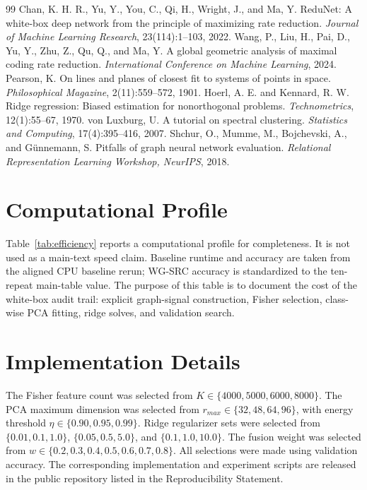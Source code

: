 \documentclass{article}
\newcommand{\SRC}{\textsc{WG-SRC}}
\begin{document}
\begin{thebibliography}{99}
 Chan, K. H. R., Yu, Y., You, C., Qi, H., Wright, J., and Ma, Y. ReduNet: A white-box deep network from the principle of maximizing rate reduction. \emph{Journal of Machine Learning Research}, 23(114):1--103, 2022.
 Wang, P., Liu, H., Pai, D., Yu, Y., Zhu, Z., Qu, Q., and Ma, Y. A global geometric analysis of maximal coding rate reduction. \emph{International Conference on Machine Learning}, 2024.
 Pearson, K. On lines and planes of closest fit to systems of points in space. \emph{Philosophical Magazine}, 2(11):559--572, 1901.
 Hoerl, A. E. and Kennard, R. W. Ridge regression: Biased estimation for nonorthogonal problems. \emph{Technometrics}, 12(1):55--67, 1970.
 von Luxburg, U. A tutorial on spectral clustering. \emph{Statistics and Computing}, 17(4):395--416, 2007.
 Shchur, O., Mumme, M., Bojchevski, A., and Günnemann, S. Pitfalls of graph neural network evaluation. \emph{Relational Representation Learning Workshop, NeurIPS}, 2018.
\end{thebibliography}

\appendix



\section{Computational Profile}
\label{app:computational-profile}

Table~\ref{tab:efficiency} reports a computational profile for completeness.
It is not used as a main-text speed claim. Baseline runtime and accuracy are
taken from the aligned CPU baseline rerun; \SRC{} accuracy is standardized to
the ten-repeat main-table value. The purpose of this table is to document the
cost of the white-box audit trail: explicit graph-signal construction, Fisher
selection, class-wise PCA fitting, ridge solves, and validation search.



\section{Implementation Details}
The Fisher feature count was selected from $K\in\{4000,5000,6000,8000\}$. The PCA maximum dimension was selected from $r_{max}\in\{32,48,64,96\}$, with energy threshold $\eta\in\{0.90,0.95,0.99\}$. Ridge regularizer sets were selected from $\{0.01,0.1,1.0\}$, $\{0.05,0.5,5.0\}$, and $\{0.1,1.0,10.0\}$. The fusion weight was selected from $w\in\{0.2,0.3,0.4,0.5,0.6,0.7,0.8\}$. All selections were made using validation accuracy. The corresponding
implementation and experiment scripts are released in the public repository
listed in the Reproducibility Statement.
\end{document}
